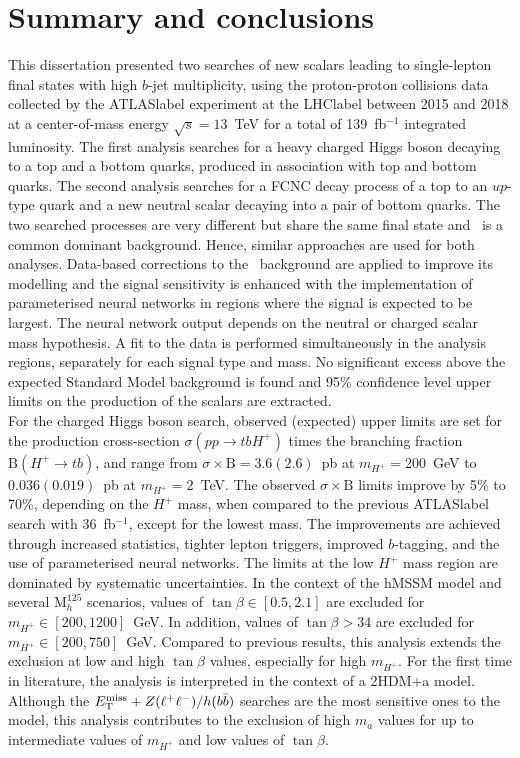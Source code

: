 \chapter{Summary and conclusions}
\label{chapter:summary}

This dissertation presented two searches of new scalars leading to single-lepton final states with high $b$-jet multiplicity, using the proton-proton collisions data collected by the \acrshort{ATLASlabel} experiment at the \acrshort{LHClabel} between 2015 and 2018 at a center-of-mass energy $\sqrt{s}=13$~TeV for a total of 139~fb$^{-1}$ integrated luminosity. The first analysis searches for a heavy charged Higgs boson decaying to a top and a bottom quarks, produced in association with top and bottom quarks. The second analysis searches for a FCNC decay process of a top to an $up$-type quark and a new neutral scalar decaying into a pair of bottom quarks. The two searched processes are very different but share the same final state and \ttjets\ is a common dominant background. Hence, similar approaches are used for both analyses. Data-based corrections to the \ttbar\ background are applied to improve its modelling and the signal sensitivity is enhanced with the implementation of parameterised neural networks in regions where the signal is expected to be largest. The neural network output depends on the neutral or charged scalar mass hypothesis. A fit to the data is performed simultaneously in the analysis regions, separately for each signal type and mass. No significant excess above the expected Standard Model background is found and 95\% confidence level upper limits on the production of the scalars are extracted.\\

For the charged Higgs boson search, observed (expected) upper limits are set for the production cross-section $\sigma(pp\to tb H^+)$ times the branching fraction $\text{B}(H^+\to tb)$, and range from $\sigma\times\text{B}=3.6(2.6)$~pb at $m_{H^+}=200$~GeV to $0.036(0.019)$~pb at $m_{H^+}=2$~TeV. The observed $\sigma\times\text{B}$ limits improve by 5\% to 70\%, depending on the $H^+$ mass, when compared to the previous \acrshort{ATLASlabel} search with 36~fb$^{-1}$, except for the lowest mass. The improvements are achieved through increased statistics, tighter lepton triggers, improved $b$-tagging, and the use of parameterised neural networks. The limits at the low $H^+$ mass region are dominated by systematic uncertainties. In the context of the hMSSM model and several $\text{M}_{h}^{125}$ scenarios, values of $\tan\beta\in[0.5,2.1]$ are excluded for $m_{H^+}\in[200,1200]$~GeV. In addition, values of $\tan\beta>34$ are excluded for $m_{H^+}\in[200,750]$~GeV. Compared to previous results, this analysis extends the exclusion at low and high $\tan\beta$ values, especially for high $m_{H^+}$. For the first time in literature, the analysis is interpreted in the context of a 2HDM+a model. Although the $E_{\text{T}}^{\text{miss}}+Z(\ell^+\ell^-)/h(b\bar{b})$ searches are the most sensitive ones to the model, this analysis contributes to the exclusion of high $m_a$ values for up to intermediate values of $m_{H^+}$ and low values of $\tan\beta$.\\

